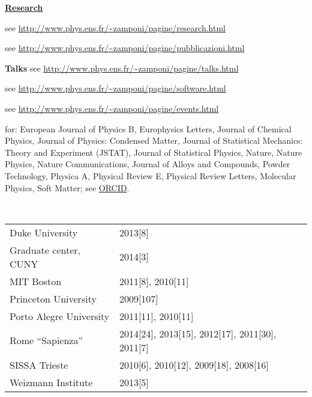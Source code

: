 \documentclass[a4paper,10pt]{article}
\begin{document}
\vskip15pt


\noindent
{\LARGE \bf \underline{Research}}

\vskip15pt
see \url{http://www.phys.ens.fr/~zamponi/pagine/research.html}


\vskip15pt
see \url{http://www.phys.ens.fr/~zamponi/pagine/pubblicazioni.html}

\vskip15pt
\noindent
{\large \bf Talks}
see \url{http://www.phys.ens.fr/~zamponi/pagine/talks.html}

\vskip15pt

see \url{http://www.phys.ens.fr/~zamponi/pagine/software.html}

\vskip15pt

see \url{http://www.phys.ens.fr/~zamponi/pagine/events.html}

\vskip15pt
 for:  
European Journal of Physics B, Europhysics Letters,
Journal of Chemical Physics,  Journal of Physics: Condensed Matter, 
Journal of Statistical Mechanics: Theory and Experiment (JSTAT), Journal of Statistical Physics,  
Nature, Nature Physics, Nature Communications,
Journal of Alloys and Compounds, Powder Technology,
Physica A,  Physical Review E, Physical Review Letters, Molecular Physics, Soft Matter;
see \href{https://orcid.org/0000-0001-9260-1951}{{\color{blue}ORCID}}.
\\


\vskip15pt

 \\
\begin{table}[h]
\begin{tabular}{ll}
Duke University &   2013[8]  \\
Graduate center, CUNY  & 2014[3] \\
MIT Boston &   2011[8], 2010[11]   \\
Princeton University & 2009[107] \\
Porto Alegre University &  2011[11], 2010[11]    \\
Rome ``Sapienza'' &  2014[24], 2013[15], 2012[17], 2011[30], 2011[7] \\
SISSA Trieste & 2010[6], 2010[12], 2009[18], 2008[16] \\
Weizmann Institute & 2013[5]    \\
\end{tabular}
\end{table}
\end{document}
